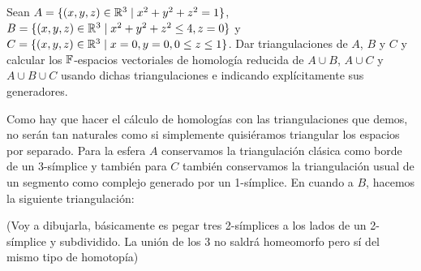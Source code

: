 \documentclass[twoside]{article}
\begin{document}
\begin{ejercicio}{2}
Sean $A=\{(x,y,z)\in\mathbb{R}^3\mid x^2+y^2+z^2=1\}$, $B=\{(x,y,z)\in\mathbb{R}^3\mid x^2+y^2+z^2\leq 4, z=0\}$ y $C=\{(x,y,z)\in\mathbb{R}^3\mid x=0,y=0, 0\leq z\leq 1\}$. Dar triangulaciones de $A$, $B$ y $C$ y calcular los $\mathbb{F}$-espacios vectoriales de homología reducida de $A\cup B$, $A\cup C$ y $A\cup B\cup C$ usando dichas triangulaciones e indicando explícitamente sus generadores.
\end{ejercicio}
\begin{solucion}
Como hay que hacer el cálculo de homologías con las triangulaciones que demos, no serán tan naturales como si simplemente quisiéramos triangular los espacios por separado. Para la esfera $A$ conservamos la triangulación clásica como borde de un 3-símplice y también para $C$ también conservamos la triangulación usual de un segmento como complejo generado por un 1-símplice. En cuando a $B$, hacemos la siguiente triangulación:

(Voy a dibujarla, básicamente es pegar tres 2-símplices a los lados de un 2-símplice y subdividido. La unión de los 3 no saldrá homeomorfo pero sí del mismo tipo de homotopía)
\end{solucion}
\end{document}
